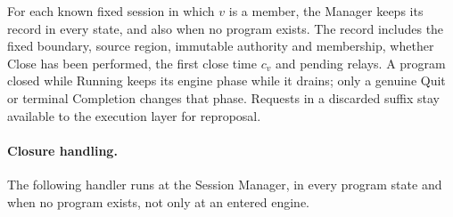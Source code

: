 \documentclass[11pt,a4paper]{article}
\begin{document}
For each known fixed session in which $v$ is a member, the Manager keeps
its record in every state, and also when no program exists. The record
includes the fixed boundary, source region, immutable authority and
membership, whether Close has been performed, the first close time $c_v$
and pending relays. A program closed while Running keeps its engine
phase while it drains; only a genuine Quit or terminal Completion
changes that phase. Requests in a discarded suffix stay available to the
execution layer for reproposal.

\paragraph{Closure handling.}
The following handler runs at the Session Manager, in every program
state and when no program exists, not only at an entered engine.
\end{document}
